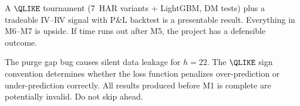 \begin{keyidea}
A $\QLIKE$ tournament (7~HAR variants + LightGBM, DM tests) plus a tradeable IV--RV signal with P\&L backtest is a presentable result.
Everything in M6--M7 is upside.
If time runs out after M5, the project has a defensible outcome.
\end{keyidea}

\begin{warning}
The purge gap bug causes silent data leakage for $h=22$.
The $\QLIKE$ sign convention determines whether the loss function penalizes over-prediction or under-prediction correctly.
All results produced before M1 is complete are potentially invalid.
Do not skip ahead.
\end{warning}
